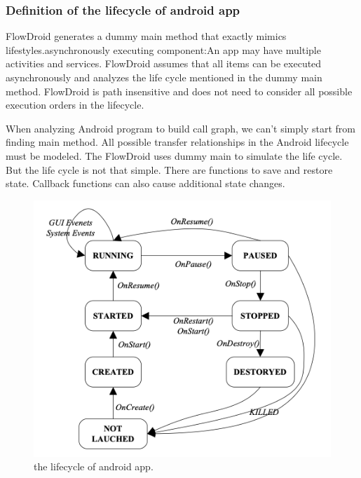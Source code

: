 \documentclass{article}
\begin{document}
\subsubsection{Definition of the lifecycle of android app}

FlowDroid generates a dummy main method that exactly mimics lifestyles.asynchronously executing component:An app may have multiple activities and services. FlowDroid assumes that all items can be executed asynchronously and analyzes the life cycle mentioned in the dummy main method. FlowDroid is path insensitive and does not need to consider all possible execution orders in the lifecycle.

When analyzing Android program to build call graph, we can't simply start from finding main method. All possible transfer relationships in the Android lifecycle must be modeled. The FlowDroid uses dummy main to simulate the life cycle. But the life cycle is not that simple. There are functions to save and restore state. Callback functions can also cause additional state changes.


\begin{figure}[ht]
  \centering
  \includegraphics[scale=0.4]{FlowDroid1.png}
  \caption{the lifecycle of android app.}
  \label{fig:FlowDroid1}
\end{figure}
\end{document}
